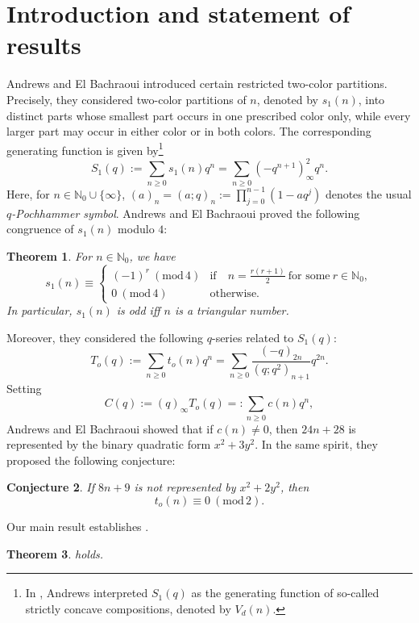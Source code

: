 \documentclass[12pt,reqno]{amsart}
\renewcommand{\(}{\left\(}
\renewcommand{\)}{\right\)}
\numberwithin{equation}{section}
\theoremstyle{plain}
\newtheorem{theorem}{Theorem}[section]
\newtheorem{conjecture}[theorem]{Conjecture}
\theoremstyle{definition}
\numberwithin{equation}{section}
\renewcommand{\pmod}[1]{\ \left( \mathrm{mod} \, #1 \right)}
\begin{document}
\section{Introduction and statement of results}
  Andrews and El Bachraoui \cite{AB} introduced certain restricted two-color partitions. Precisely, they considered two-color partitions of $n$, denoted by $s_1(n)$, into distinct parts whose smallest part occurs in one prescribed color only, while every larger part may occur in either color or in both colors. The corresponding generating function is given by\footnote{In \cite[p. 68]{AndCC}, Andrews interpreted $S_1(q)$ as the generating function of so-called strictly concave compositions, denoted by $V_d(n)$.} 
\[
S_1(q):=\sum_{n\ge 0}s_1(n)q^n=\sum_{n\ge 0}\left(-q^{n+1}\right)^2_{\infty}q^n.
\]
Here, for $n\in \mathbb{N}_0\cup \{\infty\}$, $(a)_n=(a;q)_n:=\prod_{j=0}^{n-1}(1-aq^j)$ denotes the usual {\it $q$-Pochhammer symbol}. Andrews and El Bachraoui \cite[Theorem 1]{AB} proved the following congruence of $s_1(n)$ modulo $4$:
\begin{theorem}
For $n\in \mathbb{N}_0$, we have
\[
s_1(n)\equiv \begin{cases}
(-1)^r\pmod{4} &\text{if}\quad n=\frac{r(r+1)}{2}\ \text{for some}\ r\in \mathbb{N}_0,\\
0\pmod{4} &\text{otherwise}.
\end{cases}
\]
In particular, $s_1(n)$ is odd iff $n$ is a triangular number.
\end{theorem} 
Moreover, they \cite[p. 2]{AB} considered the following $q$-series related to $S_1(q)$: 
\begin{equation}\label{A}
T_o(q):=\sum_{n\ge 0}t_o(n)q^n=\sum_{n\ge 0}\frac{(-q)_{2n}}{\left(q;q^2\right)_{n+1}}q^{2n}.
\end{equation}
Setting
\begin{equation}\label{B}
C(q):=(q)_{\infty}T_o(q)=:\sum_{n\ge 0}c(n)q^n,
\end{equation}
Andrews and El Bachraoui \cite[Theorem 3]{AB} showed that if $c(n)\neq 0$, then $24n+28$ is represented by the binary quadratic form $x^2+3y^2$. In the same spirit, they \cite[Conjecture 2]{AB} proposed the following conjecture:
\begin{conjecture}\label{conj2}
	If $8n+9$ is not represented by $x^2+2y^2$, then
	\[
	t_o(n)\equiv 0\pmod{2}.
	\]	
\end{conjecture}
Our main result establishes .%
\begin{theorem}\label{thm}
  holds. 
\end{theorem}
\end{document}
